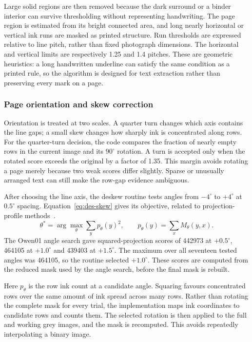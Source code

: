 Large solid regions are then removed because the dark surround or a binder interior can survive thresholding without representing handwriting. The page region is estimated from its bright connected area, and long nearly horizontal or vertical ink runs are masked as printed structure. Run thresholds are expressed relative to line pitch, rather than fixed photograph dimensions. The horizontal and vertical limits are respectively 1.25 and 1.4 pitches. These are geometric heuristics: a long handwritten underline can satisfy the same condition as a printed rule, so the algorithm is designed for text extraction rather than preserving every mark on a page.

\subsubsection{Page orientation and skew correction}
Orientation is treated at two scales. A quarter turn changes which axis contains the line gaps; a small skew changes how sharply ink is concentrated along rows. For the quarter-turn decision, the code compares the fraction of nearly empty rows in the current image and its $90^\circ$ rotation. A turn is accepted only when the rotated score exceeds the original by a factor of 1.35. This margin avoids rotating a page merely because two weak scores differ slightly. Sparse or unusually arranged text can still make the row-gap evidence ambiguous.


After choosing the line axis, the deskew routine tests angles from $-4^\circ$ to $+4^\circ$ at $0.5^\circ$ spacing. Equation~\ref{eq:des-skew} gives its objective, related to projection-profile methods~\cite[page to verify]{postl1986}.
\begin{equation}
\theta^*=\arg\max_\theta\sum_y p_\theta(y)^2,\qquad
p_\theta(y)=\sum_x M_\theta(y,x).
\label{eq:des-skew}
\end{equation}
The Owen01 angle search gave squared-projection scores of 442973 at $+0.5^\circ$, 464105 at $+1.0^\circ$ and 439403 at $+1.5^\circ$. The maximum over all seventeen tested angles was 464105, so the routine selected $+1.0^\circ$. These scores are computed from the reduced mask used by the angle search, before the final mask is rebuilt.

Here $p_\theta$ is the row ink count at a candidate angle. Squaring favours concentrated rows over the same amount of ink spread across many rows. Rather than rotating the complete mask for every trial, the implementation maps ink coordinates to candidate rows and counts them. The selected rotation is then applied to the full and working grey images, and the mask is recomputed. This avoids repeatedly interpolating a binary image.

